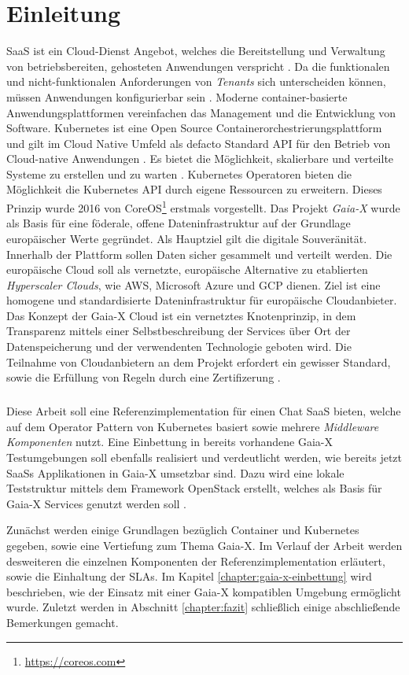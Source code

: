 \chapter{Einleitung}
\label{chap:einleitung}

\ac{SaaS} ist ein Cloud-Dienst Angebot, welches die Bereitstellung und Verwaltung von betriebsbereiten, 
gehosteten Anwendungen verspricht \cite{Krebs2012}.
Da die funktionalen und nicht-funktionalen Anforderungen von \emph{Tenants} sich unterscheiden können,
müssen Anwendungen konfigurierbar sein \cite{Schroeter2012}. 
Moderne container-basierte Anwendungsplattformen vereinfachen das Management und die Entwicklung
von Software. Kubernetes \cite{kubernetes} ist eine Open Source Containerorchestrierungsplattform und gilt im
Cloud Native Umfeld als defacto Standard API für den Betrieb von Cloud-native Anwendungen \cite{Burns2019}.
Es bietet die Möglichkeit, skalierbare und verteilte Systeme zu erstellen und zu warten \cite{Burns2019}.
Kubernetes Operatoren bieten die Möglichkeit die Kubernetes API durch eigene Ressourcen zu erweitern. 
Dieses Prinzip wurde 2016 von CoreOS\footnote{\url{https://coreos.com}} erstmals vorgestellt.
Das Projekt \emph{Gaia-X} wurde als Basis für eine föderale, offene Dateninfrastruktur auf der Grundlage europäischer Werte gegründet.
Als Hauptziel gilt die digitale Souveränität. Innerhalb der Plattform sollen Daten sicher gesammelt und verteilt werden.
Die europäische Cloud soll als vernetzte, europäische Alternative zu etablierten \emph{Hyperscaler Clouds}, wie \ac{AWS},
Microsoft Azure und \ac{GCP} dienen. Ziel ist eine homogene und standardisierte Dateninfrastruktur für europäische Cloudanbieter.
Das Konzept der Gaia-X Cloud ist ein vernetztes Knotenprinzip, in dem Transparenz mittels einer Selbstbeschreibung der Services
über Ort der Datenspeicherung und der verwendenten Technologie geboten wird.
Die Teilnahme von Cloudanbietern an dem Projekt erfordert ein gewisser Standard, sowie die Erfüllung von Regeln durch eine Zertifizerung \cite{BMWi2019}.

\paragraph{}
Diese Arbeit soll eine Referenzimplementation für einen 
Chat \ac{SaaS} bieten, welche auf dem Operator Pattern von Kubernetes basiert sowie mehrere \emph{Middleware Komponenten} nutzt.
Eine Einbettung in bereits vorhandene Gaia-X Testumgebungen soll ebenfalls realisiert und verdeutlicht werden,
wie bereits jetzt \acp{SaaS} Applikationen in Gaia-X umsetzbar sind. 
Dazu wird eine lokale Teststruktur mittels dem Framework OpenStack erstellt,
welches als Basis für Gaia-X Services genutzt werden soll \cite{scs}.

Zunächst werden einige Grundlagen bezüglich Container und Kubernetes gegeben, sowie eine Vertiefung zum Thema Gaia-X.
Im Verlauf der Arbeit werden desweiteren die einzelnen Komponenten der Referenzimplementation erläutert, sowie die Einhaltung der \acp{SLA}.
Im Kapitel \ref{chapter:gaia-x-einbettung} wird beschrieben, wie der Einsatz mit einer Gaia-X kompatiblen Umgebung ermöglicht wurde.
Zuletzt werden in Abschnitt \ref{chapter:fazit} schließlich einige abschließende Bemerkungen gemacht.
